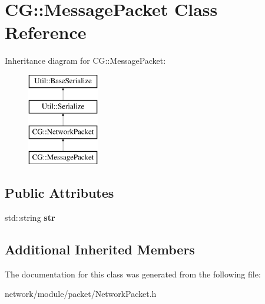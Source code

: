 \hypertarget{class_c_g_1_1_message_packet}{}\section{CG\+:\+:Message\+Packet Class Reference}
\label{class_c_g_1_1_message_packet}
Inheritance diagram for CG\+:\+:Message\+Packet\+:\begin{figure}[H]
\begin{center}
\leavevmode
\includegraphics[height=4.000000cm]{class_c_g_1_1_message_packet}
\end{center}
\end{figure}
\subsection*{Public Attributes}
\begin{DoxyCompactItemize}
\item 
\mbox{\label{class_c_g_1_1_message_packet_a75937c14ccb33df96a58444c747e6f24}} 
std\+::string {\bfseries str}
\end{DoxyCompactItemize}
\subsection*{Additional Inherited Members}


The documentation for this class was generated from the following file\+:\begin{DoxyCompactItemize}
\item 
network/module/packet/Network\+Packet.\+h\end{DoxyCompactItemize}
